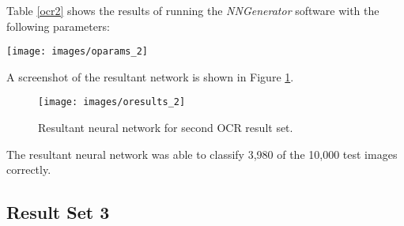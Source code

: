 Table \ref{ocr2} shows the results of running the {\it NNGenerator} software with the following parameters:

\begin{center}
\texttt{[image: images/oparams\_2]}
\end{center}

A screenshot of the resultant network is shown in Figure \ref{oresults_2}.

\begin{figure}[hbt!]
  \centering
  \texttt{[image: images/oresults\_2]}
  \caption{Resultant neural network for second OCR result set.}
  \label{oresults_2}
\end{figure}

The resultant neural network was able to classify 3,980 of the 10,000
test images correctly.

\subsection{Result Set 3}

